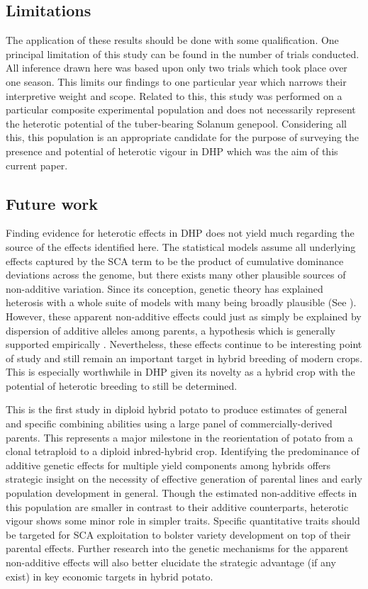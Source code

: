 \begin{refsection}
\subsection{Limitations}\label{limitations}

The application of these results should be done with some qualification. One principal limitation of this study can be found in the number of trials conducted. All inference drawn here was based upon only two trials which took place over one season. This limits our findings to one particular year which narrows their interpretive weight and scope. Related to this, this study was performed on a particular composite experimental population and does not necessarily represent the heterotic potential of the tuber-bearing Solanum genepool. Considering all this, this population is an appropriate candidate for the purpose of surveying the presence and potential of heterotic vigour in DHP which was the aim of this current paper. 

\subsection{Future work}\label{future-work}

Finding evidence for heterotic effects in DHP does not yield much regarding the source of the effects identified here. The statistical models assume all underlying effects captured by the SCA term to be the product of cumulative dominance deviations across the genome, but there exists many other plausible sources of non-additive variation. Since its conception, genetic theory has explained heterosis with a whole suite of models with many being broadly plausible (See \cite{Labroo2021}). However, these apparent non-additive effects could just as simply be explained by dispersion of additive alleles among parents, a hypothesis which is generally supported empirically \parencite{Pearson1983, Mackay2021}. Nevertheless, these effects continue to be interesting point of study and still remain an important target in hybrid breeding of modern crops. This is especially worthwhile in DHP given its novelty as a hybrid crop with the potential of heterotic breeding to still be determined.


This is the first study in diploid hybrid potato to produce estimates of general and specific combining abilities using a large panel of commercially-derived parents. This represents a major milestone in the reorientation of potato from a clonal tetraploid to a diploid inbred-hybrid crop. Identifying the predominance of additive genetic effects for multiple yield components among hybrids offers strategic insight on the necessity of effective generation of parental lines and early population development in general. Though the estimated non-additive effects in this population are smaller in contrast to their additive counterparts, heterotic vigour shows some minor role in simpler traits. Specific quantitative traits should be targeted for SCA exploitation to bolster variety development on top of their parental effects. Further research into the genetic mechanisms for the apparent non-additive effects will also better elucidate the strategic advantage (if any exist) in key economic targets in hybrid potato.


\end{refsection}
